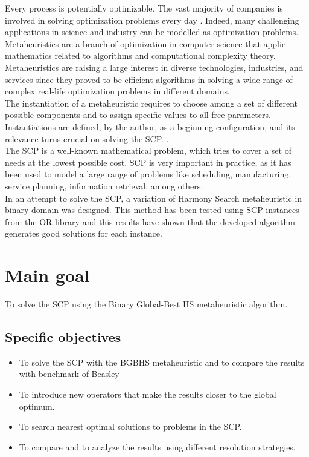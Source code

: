 Every process is potentially optimizable. The vast majority of companies is involved in solving optimization problems every day \cite{DBLP:books/daglib/0022645}. Indeed, many challenging applications in science and industry can be modelled as optimization problems.\\

Metaheuristics are a branch of optimization in computer science that applie mathematics related to algorithms and computational complexity theory. Metaheuristics are raising a large interest in diverse technologies, industries, and services since they proved to be efficient algorithms in solving a wide range of  complex real-life optimization problems in different domains.\\

The instantiation of a metaheuristic requires to choose among a set of different possible components and to assign specific values to all free parameters. Instantiations are defined, by the author, as a beginning configuration, and its relevance turns crucial on solving the SCP. \cite{DBLP:conf/gecco/BirattariSPV02}.\\

The SCP is a well-known mathematical problem, which tries to cover a set of needs at the lowest possible cost. SCP is very important in practice, as it has been used to model a large range of problems like scheduling, manufacturing, service planning, information retrieval, among others.\\

In an attempt to solve the SCP, a variation of Harmony Search metaheuristic in binary domain  was designed. This method has been tested using SCP instances from the OR-library \cite{citeulike:921349} and this results have shown that the developed algorithm generates good solutions for each instance.

\section{Main goal}
To solve the SCP using the Binary Global-Best HS metaheuristic algorithm. 

\subsection{Specific objectives}
\begin{itemize}
\item To solve the SCP with the BGBHS metaheuristic and to compare the results with benchmark of Beasley	
\item To introduce new operators that make the results closer to the global optimum.
\item To search nearest optimal solutions to problems in the SCP.
\item To compare and to analyze the results using different resolution strategies.
\end{itemize}


